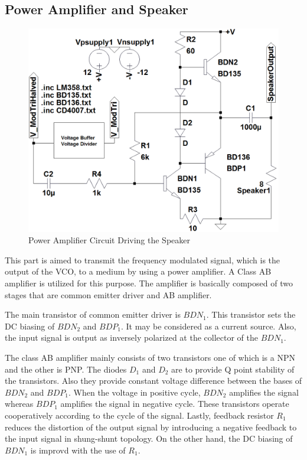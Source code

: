 \documentclass[paper]{IEEEtran}
\begin{document}
\subsection{Power Amplifier and Speaker}
\begin{figure}[h!]
 \setlength{\unitlength}{\textwidth}
 \center 
 \includegraphics[width=0.45\unitlength]{PowerAmp_Circuit}
 \caption{\label{fig:PowerAmp_Circuit}Power Amplifier Circuit Driving the Speaker}
\end{figure}
This part is aimed to transmit the frequency modulated signal, which is the output of the VCO, to a medium by using a power amplifier. A Class AB amplifier is utilized for this purpose. The amplifier is basically composed of two stages that are common emitter driver and AB amplifier.

The main transistor of common emitter driver is $BDN_{1}$. This transistor sets the DC biasing of $BDN_{2}$ and $BDP_{1}$. It may be considered as a current source. Also, the input signal is output as inversely polarized at the collector of the $BDN_{1}$.

The class AB amplifier mainly consists of two transistors one of which is a NPN and the other is PNP. The diodes $D_{1}$ and $D_{2}$ are to provide Q point stability of the transistors. Also they provide constant voltage difference between the bases of $BDN_{2}$ and $BDP_{1}$. When the voltage in positive cycle, $BDN_{2}$ amplifies the signal whereas $BDP_{1}$ amplifies the signal in negative cycle. These transistors operate cooperatively according to the cycle of the signal. Lastly, feedback resistor $R_{1}$ reduces the distortion of the output signal by introducing a negative feedback to the input signal in shung-shunt topology. On the other hand, the DC biasing of $BDN_{1}$ is improvd with the use of $R_{1}$.
\end{document}
